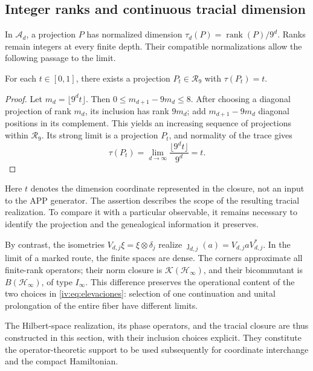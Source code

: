 \subsection{Integer ranks and continuous tracial dimension}

In \(\mathcal A_d\), a projection \(P\) has normalized
dimension \(\tau_d(P)=\operatorname{rank}(P)/9^d\).
Ranks remain integers at every finite depth. Their
compatible normalizations allow the following passage to the limit.

\begin{proposition}
\label{iv:prop:dimension-tracial}
For each \(t\in[0,1]\), there exists a projection
\(P_t\in\mathcal R_9\) with \(\tau(P_t)=t\).
\end{proposition}
\begin{proof}
Let \(m_d=\lfloor9^dt\rfloor\). Then
\(0\leq m_{d+1}-9m_d\leq8\). After choosing a diagonal projection
of rank \(m_d\), its inclusion has rank \(9m_d\);
add \(m_{d+1}-9m_d\) diagonal positions in its complement.
This yields an increasing sequence of projections within
\(\mathcal R_9\). Its strong limit is a projection \(P_t\),
and normality of the trace gives
\[
 \tau(P_t)=\lim_{d\to\infty}\frac{\lfloor9^dt\rfloor}{9^d}=t.
\]
\end{proof}

Here \(t\) denotes the dimension coordinate represented
in the closure, not an input to the APP generator. The assertion
describes the scope of the resulting tracial realization. To
compare it with a particular observable, it remains necessary to
identify the projection and the genealogical information it preserves.

By contrast, the isometries
\(V_{d,j}\xi=\xi\otimes\delta_j\) realize
\(\jmath_{d,j}(a)=V_{d,j}aV_{d,j}^*\). In the limit of a
marked route, the finite spaces are dense. The corners
approximate all finite-rank operators; their norm closure
is \(\mathcal K(\mathcal H_\infty)\), and their bicommutant is
\(B(\mathcal H_\infty)\), of type \(I_\infty\). This
difference preserves the operational content of the two choices
in \eqref{iv:eq:elevaciones}: selection of one continuation and
unital prolongation of the entire fiber have different limits.

The Hilbert-space realization, its phase operators, and the tracial
closure are thus constructed in this section, with their inclusion
choices explicit. They constitute the
operator-theoretic support to be used subsequently for coordinate
interchange and the compact Hamiltonian.
